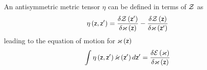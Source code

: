 An antisymmetric metric tensor $\eta $ can be defined in terms of ${\cal Z}$
as%
\begin{equation}
\eta \left( {\sf z,z}^{\prime }\right) =\frac{\delta {\cal Z}\left( {\sf z}%
^{\prime }\right) }{\delta {\cal \varkappa }\left( {\sf z}\right) }-\frac{%
\delta {\cal Z}\left( {\sf z}\right) }{\delta {\cal \varkappa }\left( {\sf z}%
^{\prime }\right) }  \label{metric}
\end{equation}%
leading to the equation of motion for ${\cal \varkappa }\left( {\sf z}%
\right) $ 
\begin{equation}
\int \eta \left( {\sf z,z}^{\prime }\right) {\cal \dot{\varkappa}}\left( 
{\sf z}^{\prime }\right) d{\sf z}^{\prime }=\frac{\delta {\cal E}\left( 
{\cal \varkappa }\right) }{\delta {\cal \varkappa }\left( {\sf z}\right) }
\label{EOM}
\end{equation}

